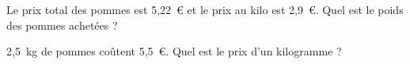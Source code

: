 \begin{myenumerate}
\item Le prix total des pommes est 5,22~\textgreek{\euro} et le prix au
kilo est 2,9~\textgreek{\euro}. Quel est le poids des pommes achetées ?
\item 2,5~kg de pommes coûtent 5,5~\textgreek{\euro}. Quel est le
prix d'un kilogramme ?
\end{myenumerate}
{
\begin{myenumerate}
  \item\subitem{}\par{}
  \item\subitem{}\par{}
\end{myenumerate}
}